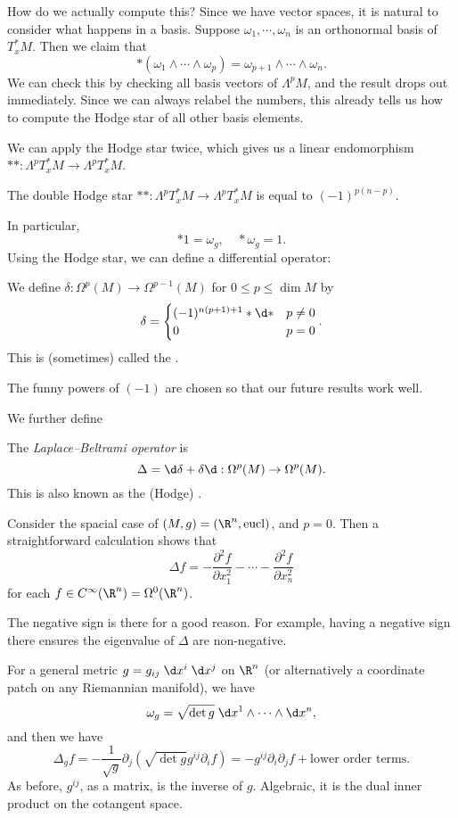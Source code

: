 \documentclass[a4paper]{article}
\begin{document}
How do we actually compute this? Since we have vector spaces, it is natural to consider what happens in a basis. Suppose $\omega_1, \cdots, \omega_n$ is an orthonormal basis of $T_x^* M$. Then we claim that
\[
  *(\omega_1 \wedge \cdots \wedge \omega_p) = \omega_{p + 1} \wedge \cdots \wedge \omega_n.
\]
We can check this by checking all basis vectors of $\Lambda^p M$, and the result drops out immediately. Since we can always relabel the numbers, this already tells us how to compute the Hodge star of all other basis elements.

We can apply the Hodge star twice, which gives us a linear endomorphism $**: \Lambda^p T_x^* M \to \Lambda^p T_x^* M$.
\begin{prop}
  The double Hodge star $**: \Lambda^p T_x^* M \to \Lambda^p T_x^* M$ is equal to $(-1)^{p(n - p)}$.
\end{prop}
In particular,
\[
  *1 = \omega_g,\quad * \omega_g = 1.
\]
Using the Hodge star, we can define a differential operator:
\begin{defi}[$\delta$]\index{$\delta$}
  We define $\delta: \Omega^p(M) \to \Omega^{p - 1}(M)$ for $0 \leq p \leq \dim M$ by
  \[
    \delta =
    \begin{cases}
      (-1)^{n(p + 1) + 1} *\d * & p \not= 0\\
      0 & p = 0
    \end{cases}.
  \]
  This is (sometimes) called the .
\end{defi}
The funny powers of $(-1)$ are chosen so that our future results work well.

We further define
\begin{defi}\index{$\Delta$}
  The \emph{Laplace--Beltrami operator} is
  \[
    \Delta = \d \delta + \delta \d: \Omega^p(M) \to \Omega^p(M).
  \]
  This is also known as the (Hodge) .
\end{defi}
Consider the spacial case of $(M, g) = (\R^n, \mathrm{eucl})$, and $p = 0$. Then a straightforward calculation shows that
\[
  \Delta f = - \frac{\partial^2 f}{\partial x_1^2} - \cdots - \frac{\partial^2 f}{\partial x_n^2}
\]
for each $f \in C^\infty(\R^n) = \Omega^0(\R^n)$.

The negative sign is there for a good reason. For example, having a negative sign there ensures the eigenvalue of $\Delta$ are non-negative.

For a general metric $g = g_{ij}\; \d x^i\; \d x^j$ on $\R^n$ (or alternatively a coordinate patch on any Riemannian manifold), we have
\[
  \omega_g = \sqrt{\det g}\;\d x^1 \wedge \cdots \wedge \d x^n,
\]
and then we have
\[
  \Delta_g f = -\frac{1}{\sqrt{g}} \partial_j (\sqrt{\det g} g^{ij} \partial_i f) = - g^{ij} \partial_i \partial_j f + \text{lower order terms}.
\]
As before, $g^{ij}$, as a matrix, is the inverse of $g$. Algebraic, it is the dual inner product on the cotangent space.
\end{document}
